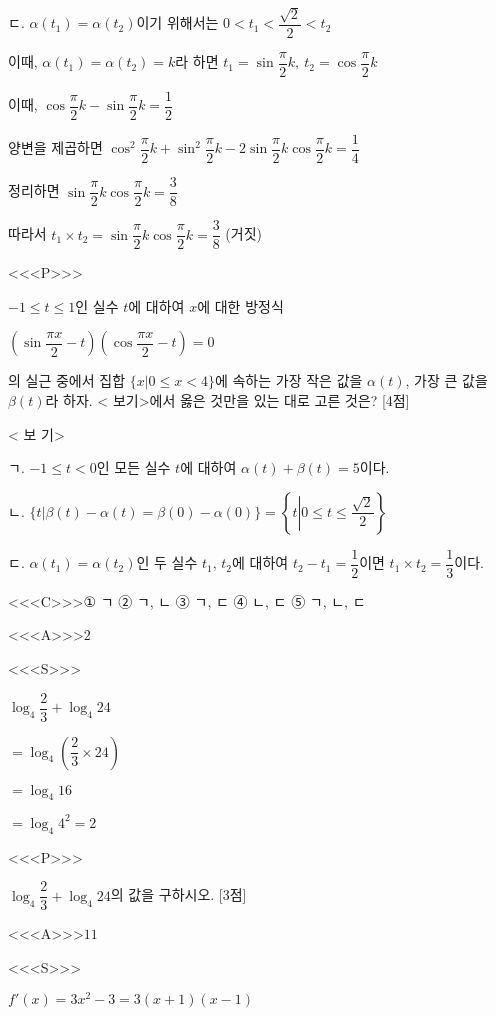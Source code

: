 \documentclass{oblivoir}
\begin{document}
ㄷ. $\alpha\left(t_{1}\right)=\alpha\left(t_{2}\right)$이기 위해서는 $0< t_{1}< \dfrac{\sqrt{2}}{2}< t_{2}$

이때, $\alpha\left(t_{1}\right)=\alpha\left(t_{2}\right)=k$라 하면 $t_{1}=\sin\dfrac{\pi}{2}k ,\:t_{2}=\cos\dfrac{\pi}{2}k$

이때, $\cos\dfrac{\pi}{2}k -\sin\dfrac{\pi}{2}k =\dfrac{1}{2}$

양변을 제곱하면 $\cos^{2}\dfrac{\pi}{2}k +\sin^{2}\dfrac{\pi}{2}k -2\sin\dfrac{\pi}{2}k\cos\dfrac{\pi}{2}k =\dfrac{1}{4}$

정리하면 $\sin\dfrac{\pi}{2}k\cos\dfrac{\pi}{2}k =\dfrac{3}{8}$

따라서 $t_{1}\times t_{2}=\sin\dfrac{\pi}{2}k\cos\dfrac{\pi}{2}k =\dfrac{3}{8}$  (거짓)

<<<P>>>

$-1\le t\le 1$인 실수 $t$에 대하여 $x$에 대한 방정식

$\left(\sin\dfrac{\pi x}{2}-t\right)\left(\cos\dfrac{\pi x}{2}-t\right)=0$

의 실근 중에서 집합 $\{x | 0\le x <  4\}$에 속하는 가장 작은 값을 $\alpha(t)$, 가장 큰 값을 $\beta(t)$라 하자. < 보기>에서 옳은 것만을 있는 대로 고른 것은? [4점]

< 보 기>

ㄱ. $-1\le t <  0$인 모든 실수 $t$에 대하여 $\alpha(t)+\beta(t)$$=5$이다.

ㄴ. $\{t |\beta(t)-\alpha(t)=\beta(0)-\alpha(0)\}=\left\{t\left | 0\le t\le\dfrac{\sqrt{2}}{2}\right\}\right.$

ㄷ. $\alpha\left(t_{1}\right)=\alpha\left(t_{2}\right)$인 두 실수 $t_{1}$, $t_{2}$에 대하여
$t_{2}-t_{1}=\dfrac{1}{2}$이면 $t_{1}\times t_{2}=\dfrac{1}{3}$이다.

<<<C>>>① ㄱ           ② ㄱ, ㄴ        ③ ㄱ, ㄷ ④ ㄴ, ㄷ ⑤ ㄱ, ㄴ, ㄷ

<<<A>>>$2$

<<<S>>>

$\log_{4}\dfrac{2}{3}+\log_{4}24$

$=\log_{4}\left(\dfrac{2}{3}\times 24\right)$

$=\log_{4}16$

$=\log_{4}4^{2}=2$

<<<P>>>

$\log_{4}\dfrac{2}{3}+\log_{4}24$의 값을 구하시오. [3점]

<<<A>>>$11$

<<<S>>>

$f'(x)=3x^{2}-3=3(x+1)(x-1)$
\end{document}
